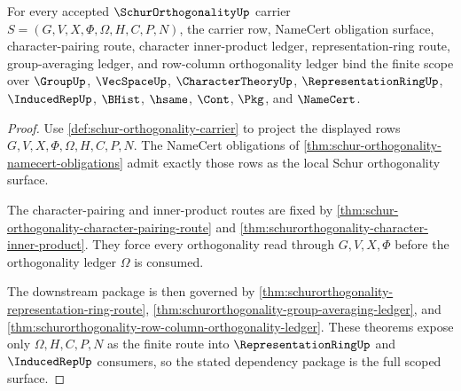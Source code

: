 \begin{theorem}
\label{thm:schurorthogonality-scoped-dependency-package}
For every accepted $\SchurOrthogonalityUp$ carrier $S=(G,V,X,\Phi,\Omega,H,C,P,N)$, the carrier row, NameCert obligation surface, character-pairing route, character inner-product ledger, representation-ring route, group-averaging ledger, and row-column orthogonality ledger bind the finite scope over $\GroupUp$, $\VecSpaceUp$, $\CharacterTheoryUp$, $\RepresentationRingUp$, $\InducedRepUp$, $\BHist$, $\hsame$, $\Cont$, $\Pkg$, and $\NameCert$.
\end{theorem}
\begin{proof}
Use \autoref{def:schur-orthogonality-carrier} to project the displayed rows $G,V,X,\Phi,\Omega,H,C,P,N$. The NameCert obligations of \autoref{thm:schur-orthogonality-namecert-obligations} admit exactly those rows as the local Schur orthogonality surface.

The character-pairing and inner-product routes are fixed by \autoref{thm:schur-orthogonality-character-pairing-route} and \autoref{thm:schurorthogonality-character-inner-product}. They force every orthogonality read through $G,V,X,\Phi$ before the orthogonality ledger $\Omega$ is consumed.

The downstream package is then governed by \autoref{thm:schurorthogonality-representation-ring-route}, \autoref{thm:schurorthogonality-group-averaging-ledger}, and \autoref{thm:schurorthogonality-row-column-orthogonality-ledger}. These theorems expose only $\Omega,H,C,P,N$ as the finite route into $\RepresentationRingUp$ and $\InducedRepUp$ consumers, so the stated dependency package is the full scoped surface.
\end{proof}

